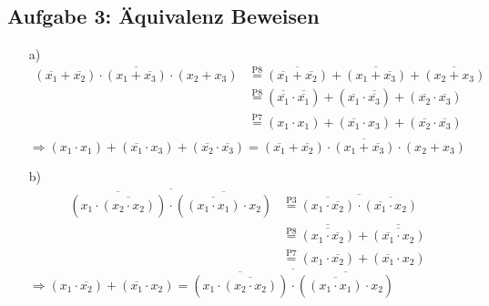 \documentclass{article}
\begin{document}
    \subsection*{Aufgabe 3: Äquivalenz Beweisen}
    \begin{itemize}
    	\item[a)]
    	\begin{align*}
    		\overline{(\overline{x_1} + \overline{x_2}) \cdot (x_1 + \overline{x_3}) \cdot (x_2 + x_3)} & \stackrel{\text{P8}}{=} \overline{(\overline{x_1} + \overline{x_2})} + \overline{(x_1 + \overline{x_3})} + \overline{(x_2 + x_3)} \\
    		& \stackrel{\text{P8}}{=} (\overline{\overline{x_1}} \cdot \overline{\overline{x_1}}) + (\overline{x_1} \cdot \overline{\overline{x_3}}) + (\overline{x_2} \cdot \overline{x_3}) \\
    		& \stackrel{\text{P7}}{=} (x_1 \cdot x_1) + (\overline{x_1} \cdot x_3) + (\overline{x_2} \cdot \overline{x_3}) \\
    	\end{align*}
    	$\Rightarrow (x_1 \cdot x_1) + (\overline{x_1} \cdot x_3) + (\overline{x_2} \cdot \overline{x_3}) = \overline{(\overline{x_1} + \overline{x_2}) \cdot (x_1 + \overline{x_3}) \cdot (x_2 + x_3)}$
    	\item[b)]
    	\begin{align*}
    		\overline{\overline{(x_1 \cdot \overline{(x_2 \cdot x_2)})} \cdot \overline{(\overline{(x_1 \cdot x_1)} \cdot x_2)}} & \stackrel{\text{P3}}{=} \overline{\overline{(x_1 \cdot \overline{x_2})} \cdot \overline{(\overline{x_1} \cdot x_2)}} \\
    		& \stackrel{\text{P8}}{=} \overline{\overline{(x_1 \cdot \overline{x_2})}} + \overline{\overline{(\overline{x_1} \cdot x_2)}} \\
    		& \stackrel{\text{P7}}{=} (x_1 \cdot \overline{x_2}) + (\overline{x_1} \cdot x_2)
    	\end{align*}
    	$\Rightarrow (x_1 \cdot \overline{x_2}) + (\overline{x_1} \cdot x_2) = \overline{\overline{(x_1 \cdot \overline{(x_2 \cdot x_2)})} \cdot \overline{(\overline{(x_1 \cdot x_1)} \cdot x_2)}}$
    \end{itemize}
    
\end{document}
